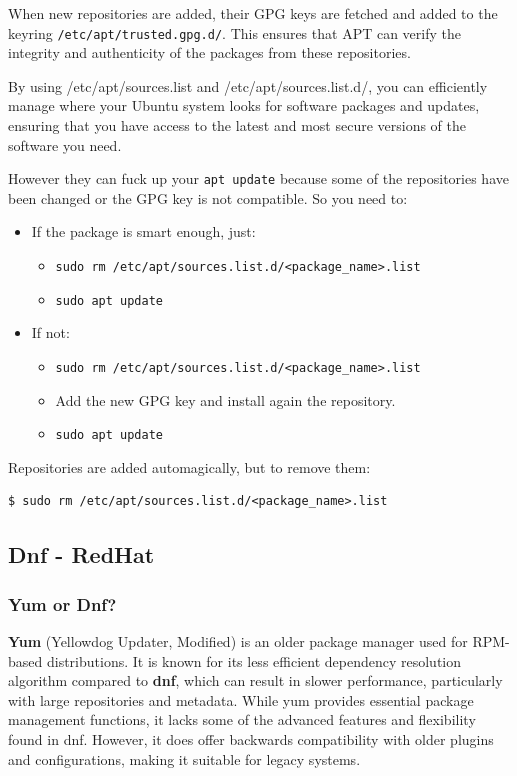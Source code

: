 \documentclass{article}
\newenvironment{blocktemplateIII}[1]{%
    \tcolorbox[beamer,%
    noparskip,breakable,
    ,colframe=Red,%
    colbacklower=LimeGreen!75!LightGreen,%
    title=#1]}%
    {\endtcolorbox}
\newenvironment{codetemplate}[1][]{%
  \mybasecolorbox[#1]
  \itshape
}{%
  \endmybasecolorbox
}
\begin{document}
When new repositories are added,  their GPG keys are fetched and added to the keyring \verb|/etc/apt/trusted.gpg.d/|. This ensures that APT can verify the integrity and authenticity of the packages from these repositories. 

By using /etc/apt/sources.list and /etc/apt/sources.list.d/, you can efficiently manage where your Ubuntu system looks for software packages and updates, ensuring that you have access to the latest and most secure versions of the software you need.

\begin{blocktemplateIII}{Warning}
However they can fuck up your \verb|apt update| because some of the repositories have been changed or the GPG key is not compatible. So you need to:
\begin{itemize}
    \item If the package is smart enough, just:
    \begin{itemize}
        \item \verb|sudo rm /etc/apt/sources.list.d/<package_name>.list|
        \item \verb|sudo apt update|
    \end{itemize}

    \item If not:
    \begin{itemize}
        \item \verb|sudo rm /etc/apt/sources.list.d/<package_name>.list|
        \item Add the new GPG key and install again the repository.
        \item \verb|sudo apt update|
    \end{itemize}
\end{itemize} 
\end{blocktemplateIII}

Repositories are added automagically, but to remove them:
\begin{codetemplate}
\begin{verbatim}
$ sudo rm /etc/apt/sources.list.d/<package_name>.list
\end{verbatim}
\end{codetemplate}

\subsection{Dnf - RedHat}

\subsubsection{Yum or Dnf?}
\textbf{Yum} (Yellowdog Updater, Modified) is an older package manager used for RPM-based distributions. It is known for its less efficient dependency resolution algorithm compared to \textbf{dnf}, which can result in slower performance, particularly with large repositories and metadata. While yum provides essential package management functions, it lacks some of the advanced features and flexibility found in dnf. However, it does offer backwards compatibility with older plugins and configurations, making it suitable for legacy systems.
\end{document}
